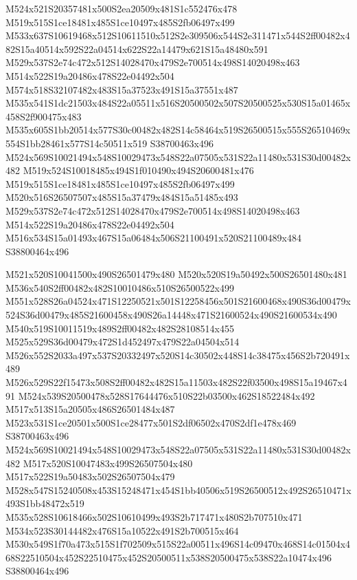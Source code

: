 \documentclass{article}
\begin{document}
\begin{multicols}{2}
M524x521S20357481x500S2ea20509x481S1c552476x478 M519x515S1ce18481x485S1ce10497x485S2fb06497x499 M533x637S10619468x512S10611510x512S2e309506x544S2e311471x544S2ff00482x482S15a40514x592S22a04514x622S22a14479x621S15a48480x591 M529x537S2e74c472x512S14028470x479S2e700514x498S14020498x463 M514x522S19a20486x478S22e04492x504 M574x518S32107482x483S15a37523x491S15a37551x487 M535x541S1dc21503x484S22a05511x516S20500502x507S20500525x530S15a01465x458S2f900475x483 M535x605S1bb20514x577S30c00482x482S14c58464x519S26500515x555S26510469x554S1bb28461x577S14c50511x519 S38700463x496 M524x569S10021494x548S10029473x548S22a07505x531S22a11480x531S30d00482x482 M519x524S10018485x494S1f010490x494S20600481x476 M519x515S1ce18481x485S1ce10497x485S2fb06497x499 M520x516S26507507x485S15a37479x484S15a51485x493 M529x537S2e74c472x512S14028470x479S2e700514x498S14020498x463 M514x522S19a20486x478S22e04492x504 M516x534S15a01493x467S15a06484x506S21100491x520S21100489x484 S38800464x496

M521x520S10041500x490S26501479x480 M520x520S19a50492x500S26501480x481 M536x540S2ff00482x482S10010486x510S26500522x499 M551x528S26a04524x471S12250521x501S12258456x501S21600468x490S36d00479x524S36d00479x485S21600458x490S26a14448x471S21600524x490S21600534x490 M540x519S10011519x489S2ff00482x482S28108514x455 M525x529S36d00479x472S1d452497x479S22a04504x514 M526x552S2033a497x537S20332497x520S14c30502x448S14c38475x456S2b720491x489 M526x529S22f15473x508S2ff00482x482S15a11503x482S22f03500x498S15a19467x491 M524x539S20500478x528S17644476x510S22b03500x462S18522484x492 M517x513S15a20505x486S26501484x487 M523x531S1ce20501x500S1ce28477x501S2df06502x470S2df1e478x469 S38700463x496 M524x569S10021494x548S10029473x548S22a07505x531S22a11480x531S30d00482x482 M517x520S10047483x499S26507504x480 M517x522S19a50483x502S26507504x479 M528x547S15240508x453S15248471x454S1bb40506x519S26500512x492S26510471x493S1bb48472x519 M535x528S10618466x502S10610499x493S2b717471x480S2b707510x471 M534x523S30144482x476S15a10522x491S2b700515x464 M530x549S1f70a473x515S1f702509x515S22a00511x496S14c09470x468S14c01504x468S22510504x452S22510475x452S20500511x538S20500475x538S22a10474x496 S38800464x496


\end{multicols}
\end{document}
